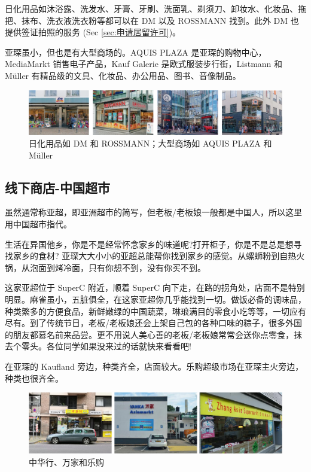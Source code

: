     日化用品如沐浴露、洗发水、牙膏、牙刷、洗面乳、剃须刀、卸妆水、化妆品、拖把、抹布、洗衣液洗衣粉等都可以在 DM 以及 ROSSMANN 找到。此外 DM 也提供签证拍照的服务 (Sec \ref{sec:申请居留许可})。

    亚琛虽小，但也是有大型商场的。AQUIS PLAZA 是亚琛的购物中心，MediaMarkt 销售电子产品，Kauf Galerie 是欧式服装步行街，Listmann 和 Müller 有精品级的文具、化妆品、办公用品、图书、音像制品。

    \begin{figure}[ht]
      \centering
      \includegraphics[width=\textwidth]{在亚琛学习和生活/日常消费和饮食/德国超市/日化用品如 DM 和 ROSSMANN；大型商场如 AQUIS PLAZA 和 Müller.png}
      \caption{日化用品如 DM 和 ROSSMANN；大型商场如 AQUIS PLAZA 和 Müller}
      \label{fig:日化用品如 DM 和 ROSSMANN；大型商场如 AQUIS PLAZA 和 Müller}
    \end{figure}

  \subsection{线下商店-中国超市}\label{subsec:线下商店-中国超市}

    虽然通常称亚超，即亚洲超市的简写，但老板/老板娘一般都是中国人，所以这里用中国超市指代。

    生活在异国他乡，你是不是经常怀念家乡的味道呢?打开柜子，你是不是总是想寻找家乡的食材? 亚琛大大小小的亚超总能帮你找到家乡的感觉。从螺蛳粉到自热火锅，从泡面到烤冷面，只有你想不到，没有你买不到。

    \href{http://www.sinostore.de/}{} 这家亚超位于 SuperC 附近，顺着 SuperC 向下走，在路的拐角处，店面不是特别明显。麻雀虽小，五脏俱全，在这家亚超你几乎能找到一切。做饭必备的调味品，种类繁多的方便食品，新鲜嫩绿的中国蔬菜，琳琅满目的零食小吃等等，一切应有尽有。到了传统节日，老板/老板娘还会上架自己包的各种口味的粽子，很多外国的朋友都慕名前来品尝。更不用说人美心善的老板/老板娘常常会送你点零食，抹去个零头。各位同学如果没来过的话就快来看看吧!

    \href{https://homeasia.de/}{} 在亚琛的 Kaufland 旁边，种类齐全，店面较大。乐购超级市场在亚琛主火旁边，种类也很齐全。

    \begin{figure}[ht]
      \centering
      \includegraphics[width=.9\textwidth]{在亚琛学习和生活/日常消费和饮食/中华行、万家和乐购.png}
      \caption{中华行、万家和乐购}
      \label{fig:中华行、万家和乐购}
    \end{figure}

